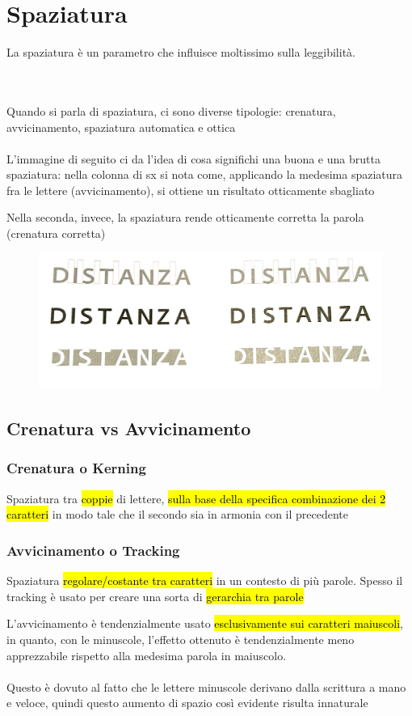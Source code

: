  \section{Spaziatura}
La spaziatura è un parametro che influisce moltissimo sulla leggibilità. 
    
\\\\Quando si parla di spaziatura, ci sono diverse tipologie: crenatura, avvicinamento, spaziatura automatica e ottica
\\\\
L'immagine di seguito ci da l'idea di cosa significhi una buona e una brutta spaziatura: nella colonna di sx si nota come, applicando la medesima spaziatura fra le lettere (avvicinamento), si ottiene un risultato otticamente sbagliato

Nella seconda, invece, la spaziatura rende otticamente corretta la parola (crenatura corretta)
\begin{figure}[H]
    \centering
    \includegraphics[width=0.2\linewidth]{lzione_4/imgs/f7.jpg}
\end{figure}
    \subsection{Crenatura vs Avvicinamento}
    \subsubsection{Crenatura o Kerning}
    Spaziatura tra \hl{coppie} di lettere, \hl{sulla base della specifica combinazione dei 2 caratteri} in modo tale che il secondo sia in armonia con il precedente 
    \subsubsection{Avvicinamento o Tracking}
    Spaziatura \hl{regolare/costante tra caratteri} in un contesto di più parole. Spesso il tracking è usato per creare una sorta di \hl{gerarchia tra parole}

    \begin{mdframed}[style=mystyle,frametitle=Tip]
        L'avvicinamento è tendenzialmente usato \hl{esclusivamente sui caratteri maiuscoli}, in quanto, con le minuscole, l'effetto ottenuto è tendenzialmente meno apprezzabile rispetto alla medesima parola in maiuscolo.
        \\\\
        Questo è dovuto al fatto che le lettere minuscole derivano dalla scrittura a mano e veloce, quindi questo aumento di spazio così evidente risulta innaturale
    \end{mdframed}

